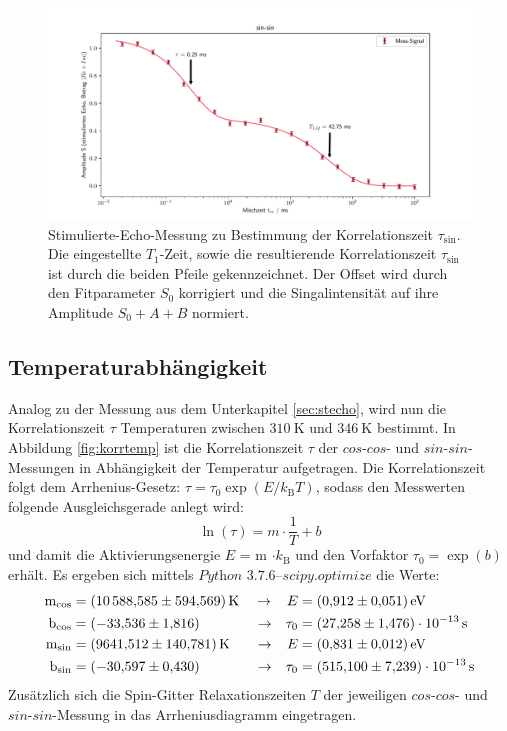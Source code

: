 \begin{figure}[H]
    \centering
    \includegraphics[width=\textwidth]{Auswertung/Para_der_Korrfkt/sin_sin.pdf}
    \caption{Stimulierte-Echo-Messung zu Bestimmung der Korrelationszeit
    $\tau_{\text{sin}}$. Die eingestellte $T_1$-Zeit, sowie die resultierende
    Korrelationszeit $\tau_{\text{sin}}$ ist durch die beiden Pfeile gekennzeichnet.
    Der Offset wird durch den Fitparameter $S_0$ korrigiert und die
    Singalintensität auf ihre Amplitude $S_0+A+B$ normiert.}
    \label{fig:sin-sin}
\end{figure}

\subsection{Temperaturabhängigkeit}
\label{sec:tempabh}
Analog zu der Messung aus dem Unterkapitel \ref{sec:stecho}, wird nun die
Korrelationszeit $\tau$ Temperaturen zwischen $\SI{310}{\kelvin}$
und $\SI{346}{\kelvin}$ bestimmt. In Abbildung \ref{fig:korrtemp}
ist die Korrelationszeit $\tau$ der $cos$-$cos$- und $sin$-$sin$-Messungen
in Abhängigkeit der Temperatur aufgetragen. Die Korrelationszeit folgt
dem Arrhenius-Gesetz: $\tau = \tau_0 \exp{(E/k_{\text{B}}T)}$, sodass den Messwerten
folgende Ausgleichsgerade anlegt wird:
\begin{equation*}
  \ln{(\tau)} = m \cdot \frac{1}{T} + b
\end{equation*}
\noindent
und damit die Aktivierungsenergie $E$ = m $\cdot k_{\text{B}}$ und den Vorfaktor
$\tau_0 = \exp{(b)}$ erhält. Es ergeben sich mittels
$\textit{Python 3.7.6--scipy.optimize}$ die Werte:
\begin{align*}
  \text{m}_{\text{cos}} &= \SI{10588,585\pm594,569}{\kelvin}
  \quad\rightarrow
  &E &= \SI{0.912\pm0.051}{\electronvolt} \\
  \text{b}_{\text{cos}} &= \SI{-33,536\pm1,816}
  \qquad\quad\,\;\;\rightarrow
  &\tau_0 &= \SI{27,258\pm1,476 e-13}{\second} \\
  \text{m}_{\text{sin}} &= \SI{9641,512\pm140,781}{\kelvin}
  \,\;\;\quad\rightarrow
  &E &= \SI{0.831\pm0.012}{\electronvolt} \\
  \text{b}_{\text{sin}} &= \SI{-30,597\pm0.430}
  \qquad\quad\,\;\;\rightarrow
  &\tau_0 &= \SI{515,100\pm7,239 e-13}{\second}
\end{align*}
\noindent
Zusätzlich sich die Spin-Gitter Relaxationszeiten $T$ der jeweiligen $cos$-$cos$-
und $sin$-$sin$-Messung in das Arrheniusdiagramm eingetragen.

